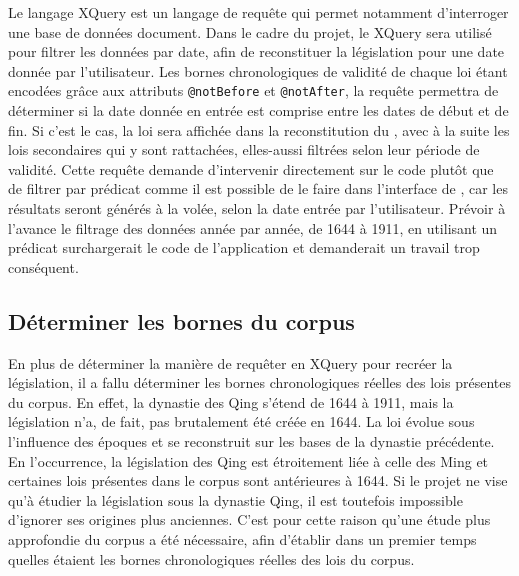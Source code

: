 Le langage XQuery est un langage de requête qui permet notamment d'interroger une base de données document. Dans le cadre du projet, le XQuery sera utilisé pour filtrer les données \XML par date, afin de reconstituer la législation pour une date donnée par l'utilisateur. Les bornes chronologiques de validité de chaque loi étant encodées grâce aux attributs \texttt{@notBefore} et \texttt{@notAfter}, la requête permettra de déterminer si la date donnée en entrée est comprise entre les dates de début et de fin. Si c'est le cas, la loi sera affichée dans la reconstitution du \cv, avec à la suite les lois secondaires qui y sont rattachées, elles-aussi filtrées selon leur période de validité. Cette requête demande d'intervenir directement sur le code plutôt que de filtrer par prédicat comme il est possible de le faire dans l'interface de \tp, car les résultats seront générés à la volée, selon la date entrée par l'utilisateur. Prévoir à l'avance le filtrage des données année par année, de 1644 à 1911, en utilisant un prédicat surchargerait le code de l'application et demanderait un travail trop conséquent. 

\subsection{Déterminer les bornes du corpus}

En plus de déterminer la manière de requêter en XQuery pour recréer la législation, il a fallu déterminer les bornes chronologiques réelles des lois présentes du corpus. En effet, la dynastie des Qing s'étend de 1644 à 1911, mais la législation n'a, de fait, pas brutalement été créée en 1644. La loi évolue sous l'influence des époques et se reconstruit sur les bases de la dynastie précédente. En l'occurrence, la législation des Qing est étroitement liée à celle des Ming et certaines lois présentes dans le corpus sont antérieures à 1644. Si le projet \COREL ne vise qu'à étudier la législation sous la dynastie Qing, il est toutefois impossible d'ignorer ses origines plus anciennes. C'est pour cette raison qu'une étude plus approfondie du corpus a été nécessaire, afin d'établir dans un premier temps quelles étaient les bornes chronologiques réelles des lois du corpus. 

